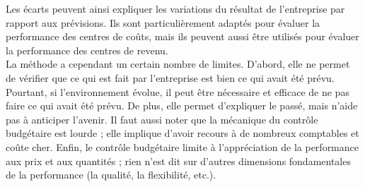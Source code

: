 \documentclass{tufte-handout}
\begin{document}
\begin{enumerate}
Les écarts peuvent ainsi expliquer les variations du résultat de l’entreprise par rapport aux prévisions. Ils sont particulièrement adaptés pour évaluer la performance des centres de coûts, mais ils peuvent aussi être utilisés pour évaluer la performance des centres de revenu.\\

La méthode a cependant un certain nombre de limites. D’abord, elle ne permet de vérifier que ce qui est fait par l’entreprise est bien ce qui avait été prévu. Pourtant, si l’environnement évolue, il peut être nécessaire et efficace de ne pas faire ce qui avait été prévu. De plus, elle permet d’expliquer le passé, mais n’aide pas à anticiper l’avenir. Il faut aussi noter que la mécanique du contrôle budgétaire est lourde ; elle implique d’avoir recours à de nombreux comptables et coûte cher. Enfin, le contrôle budgétaire limite à l’appréciation de la performance aux prix et aux quantités ; rien n’est dit sur d’autres dimensions fondamentales de la performance (la qualité, la flexibilité, etc.).\\


\end{enumerate}
\end{document}
